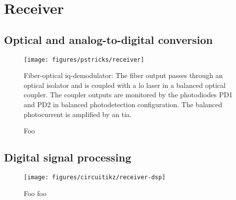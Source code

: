 \section{Receiver}


\subsection{Optical and analog-to-digital conversion}

\begin{figure}[htb]
	\centering
	\texttt{[image: figures/pstricks/receiver]}
	\caption{Fiber-optical \gls{iq}-demodulator: The fiber output passes through an optical isolator and is coupled with a \gls{lo} laser in a balanced optical coupler. The coupler outputs are monitored by the photodiodes PD1 and PD2 in balanced photodetection configuration. The balanced photocurrent is amplified by an \gls{tia}.}
\end{figure}

\begin{figure}[htb]
	\centering
	
	\caption{Foo}
\end{figure}

\FloatBarrier
\subsection{Digital signal processing}


\begin{figure}[htb]
	\centering
	\texttt{[image: figures/circuitikz/receiver-dsp]}
	\caption{Foo foo}
\end{figure}